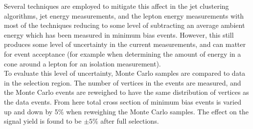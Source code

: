 Several techniques are employed to mitigate this affect in the jet clustering algorithms, jet energy measurements, and the lepton energy measurements with most of the techniques reducing to some level of subtracting an average ambient energy which has been measured in minimum bias events. However, this still produces some level of uncertainty in the current measurements, and can matter for event acceptance (for example when determining the amount of energy in a cone around a lepton for an isolation measurement).\\

To evaluate this level of uncertainty, Monte Carlo samples are compared to data in the selection region. The number of vertices in the events are measured, and the Monte Carlo events are reweighed to have the same distribution of vertices as the data events. From here total cross section of minimum bias events is varied up and down by 5\% when reweighing the Monte Carlo samples. The effect on the signal yield is found to be $\pm 5\%$ after full selections.
